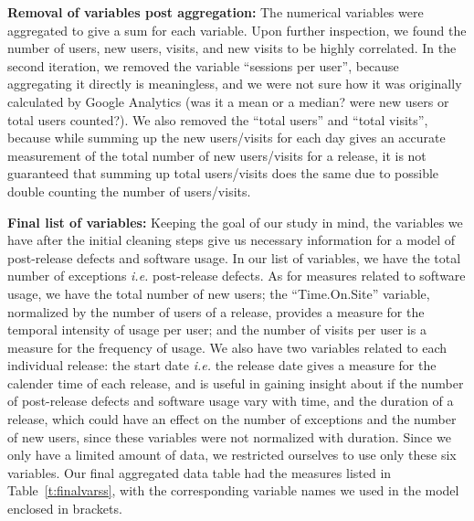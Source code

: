 \documentclass[smallcondensed]{svjour3}     %
\begin{document}
\noindent
\textbf{Removal  of variables post aggregation:}
The numerical variables were aggregated to give a sum for each
variable. Upon further inspection, we found the number of users, new
users, visits, and new visits to be highly correlated. In the second
iteration, we removed the variable ``sessions per user'', because
aggregating it directly is meaningless, and we were not sure how it
was originally calculated by Google Analytics (was it a mean or
a median? were new users or total users counted?). We also removed
the ``total users'' and ``total visits'', because while summing up the
new users/visits for each day gives an accurate measurement of the total
number of new users/visits for a release, it is not guaranteed that
summing up total users/visits does the same due to possible double
counting the number of users/visits. 

\noindent
\textbf{Final list of variables:}
Keeping the goal of our study in mind, the variables we have after the initial cleaning 
steps give us necessary information for a model of post-release defects and software usage.
In our list of variables, we have the total number of exceptions \textit{i.e.} post-release defects. 
As for measures related to software usage, we have the total number of new users;
the ``Time.On.Site'' variable, normalized by the number of users of a release,
provides a measure for the temporal intensity of usage per user;
and the number of visits per user is a measure for the frequency of usage.
We also have two variables related to each individual release: the start date \textit{i.e.} the release
date gives a measure for the calender time of each release, and is useful in gaining insight
about if the number of post-release defects and software usage vary with time, and 
the duration of a release, which could have an effect on the number of exceptions
and the number of new users, since these variables were not normalized with duration.
Since we only have a limited amount of data, we restricted ourselves to use only 
these six variables.
Our final aggregated data table had the measures listed in Table~\ref{t:finalvarss}, 
with the corresponding variable names we used in the model enclosed in brackets. 
\end{document}
